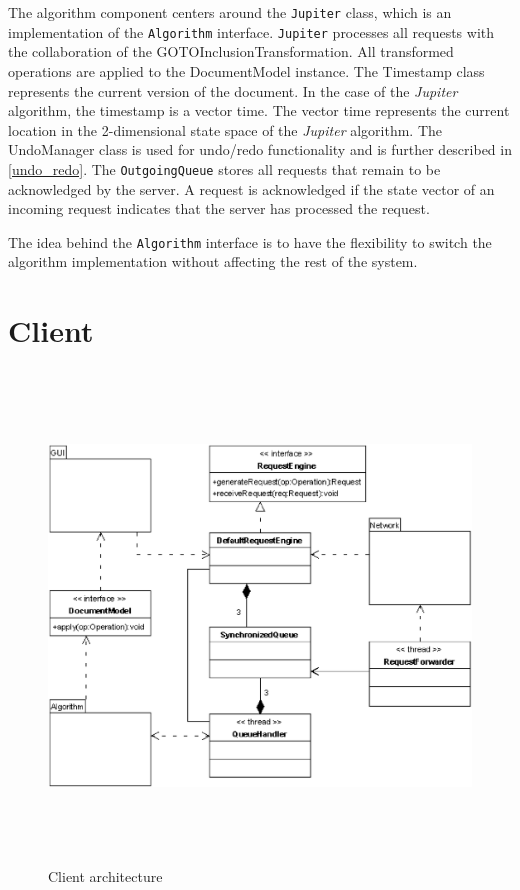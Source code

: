 The algorithm component centers around the \texttt{Jupiter} class, which is an implementation of the \texttt{Algorithm} interface. \texttt{Jupiter} processes all requests with the collaboration of the GOTOInclusionTransformation. All transformed operations are applied to the DocumentModel instance. The Timestamp class represents the current version of the document. In the case of the \emph{Jupiter} algorithm, the timestamp is a vector time. The vector time represents the current location in the 2-dimensional state space of the \emph{Jupiter} algorithm. The UndoManager class is used for undo/redo functionality and is further described in \ref{undo_redo}. The \texttt{OutgoingQueue} stores all requests that remain to be acknowledged by the server. A request is acknowledged if the state vector of an incoming request indicates that the server has processed the request.

The idea behind the \texttt{Algorithm} interface is to have the flexibility to switch the algorithm implementation without affecting the rest of the system.

\section{Client}
\begin{figure}[H]
\centering
\includegraphics[height=13.04cm,width=15.46cm]{../../images/algo-impl/client_diagram.eps}
\caption{Client architecture}
\label{Client architecture}
\end{figure}

